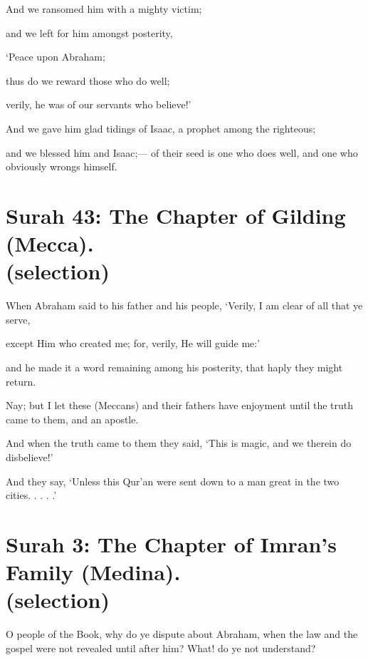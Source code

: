 \documentclass[fontsize=14pt, letterpaper, notitlepage, openany, DIV=12]{scrbook} %
\begin{document}
\noindent[37:107]
And we ransomed him with a mighty victim;

\noindent[37:108]
and we left for him amongst posterity,

\noindent[37:109]
`Peace upon Abraham;

\noindent[37:110]
thus do we reward those who do well;

\noindent[37:111]
verily, he was of our servants who believe!'

\noindent[37:112]
And we gave him glad tidings of Isaac, a prophet among the righteous;

\noindent[37:113]
and we blessed him and Isaac;--- of their seed is one who does well, and one who
obviously wrongs himself.


\section[Surah 43: The Chapter of Gilding (Mecca).]{Surah 43: The Chapter of Gilding (Mecca).\\ (selection)}


\noindent[43:26]
When Abraham said to his father and his people, `Verily, I am clear of all that ye serve,

\noindent[43:27]
except Him who created me; for, verily, He will guide me:'

\noindent[43:28]
and he made it a word remaining among his posterity, that haply they might return.

\noindent[43:29]
Nay; but I let these (Meccans) and their fathers have enjoyment until the truth came to
them, and an apostle.

\noindent[43:30]
And when the truth came to them they said, `This is magic, and we therein do
disbelieve!'

\noindent[43:31]
And they say, `Unless this Qur'an were sent down to a man great in the two cities. . . . .'


\section[Surah 3: The Chapter of Imran's Family (Medina).]{Surah 3: The Chapter of Imran's Family (Medina).\\ (selection)}


\noindent[3:65]
O people of the Book, why do ye dispute about Abraham, when the law and the gospel
were not revealed until after him? What! do ye not understand?
\end{document}
